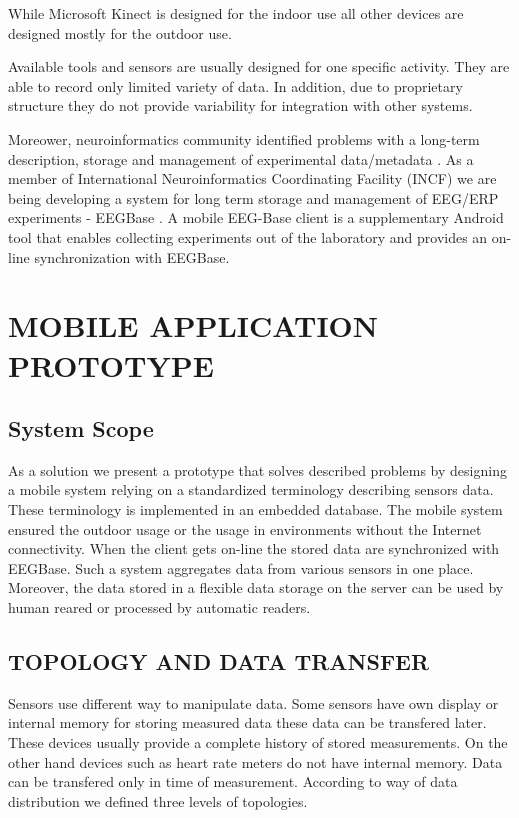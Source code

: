\documentclass[a4paper,twoside]{article}
\begin{document}
While Microsoft Kinect is designed for the indoor use all other devices are designed mostly for the outdoor use. 

Available tools and sensors are usually designed for one specific activity. They are able to record only limited variety of data. In addition, due to proprietary structure they do not provide variability for integration with other systems. 

Moreower, neuroinformatics community identified problems with a long-term description, storage and management of experimental data/metadata \cite{CRCNS}. As a member of International Neuroinformatics Coordinating Facility (INCF) \cite{INCF} we are being developing a system for long term storage and management of EEG/ERP experiments - EEGBase \cite{ISI:000306821100004}. A mobile EEG-Base client \cite{10.3389/conf.fninf.2013.09.00046} is a supplementary Android tool that enables collecting experiments out of the laboratory and provides an on-line synchronization with EEGBase.

\section{\uppercase{Mobile application prototype}}
\label{mobile_app_prototype}


\subsection{System Scope}
As a solution we present a prototype that solves described problems by designing a mobile system relying on a standardized terminology describing sensors data. These terminology is implemented in an embedded database. The mobile system ensured the outdoor usage or the usage in environments without the Internet connectivity. When the client gets on-line the stored data are synchronized with EEGBase. Such a system aggregates data from various sensors in one place. Moreover, the data stored in a flexible data storage on the server can be used by human reared or processed by automatic readers.

\subsection{\uppercase{Topology and Data Transfer}}
\label{topology_data_transfer}

\noindent 
Sensors use different way to manipulate data. Some sensors have own display or internal memory for storing measured data these data can be transfered later. These devices usually provide a complete history of stored measurements. On the other hand devices such as heart rate meters do not have internal memory. Data can be transfered only in time of measurement. According to way of data distribution we defined three levels of topologies.
\end{document}
